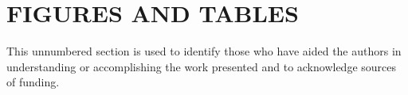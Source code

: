 \documentclass[a4paper]{spie}  %
\begin{document}
\section{FIGURES AND TABLES} 
 

\acknowledgments     %
 
This unnumbered section is used to identify those who have aided the authors in understanding or accomplishing the work presented and to acknowledge sources of funding.  \cite{Anderson2009}


\end{document}
